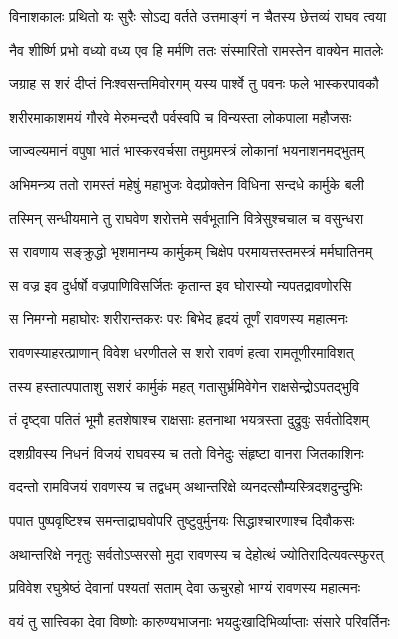 \twolineshloka
{विनाशकालः प्रथितो यः सुरैः सोऽद्य वर्तते}
{उत्तमाङ्गं न चैतस्य छेत्तव्यं राघव त्वया} %

\twolineshloka
{नैव शीर्ष्णि प्रभो वध्यो वध्य एव हि मर्मणि}
{ततः संस्मारितो रामस्तेन वाक्येन मातलेः} %

\twolineshloka
{जग्राह स शरं दीप्तं निःश्वसन्तमिवोरगम्}
{यस्य पार्श्वे तु पवनः फले भास्करपावकौ} %

\twolineshloka
{शरीरमाकाशमयं गौरवे मेरुमन्दरौ}
{पर्वस्वपि च विन्यस्ता लोकपाला महौजसः} %

\twolineshloka
{जाज्वल्यमानं वपुषा भातं भास्करवर्चसा}
{तमुग्रमस्त्रं लोकानां भयनाशनमद्भुतम्} %

\twolineshloka
{अभिमन्त्र्य ततो रामस्तं महेषुं महाभुजः}
{वेदप्रोक्तेन विधिना सन्दधे कार्मुके बली} %

\twolineshloka
{तस्मिन् सन्धीयमाने तु राघवेण शरोत्तमे}
{सर्वभूतानि वित्रेसुश्चचाल च वसुन्धरा} %

\twolineshloka
{स रावणाय सङ्क्रुद्धो भृशमानम्य कार्मुकम्}
{चिक्षेप परमायत्तस्तमस्त्रं मर्मघातिनम्} %

\twolineshloka
{स वज्र इव दुर्धर्षो वज्रपाणिविसर्जितः}
{कृतान्त इव घोरास्यो न्यपतद्रावणोरसि} %

\twolineshloka
{स निमग्नो महाघोरः शरीरान्तकरः परः}
{बिभेद हृदयं तूर्णं रावणस्य महात्मनः} %

\twolineshloka
{रावणस्याहरत्प्राणान् विवेश धरणीतले}
{स शरो रावणं हत्वा रामतूणीरमाविशत्} %

\twolineshloka
{तस्य हस्तात्पपाताशु सशरं कार्मुकं महत्}
{गतासुर्भ्रमिवेगेन राक्षसेन्द्रोऽपतद्भुवि} %

\twolineshloka
{तं दृष्ट्वा पतितं भूमौ हतशेषाश्च राक्षसाः}
{हतनाथा भयत्रस्ता दुद्रुवुः सर्वतोदिशम्} %

\twolineshloka
{दशग्रीवस्य निधनं विजयं राघवस्य च}
{ततो विनेदुः संहृष्टा वानरा जितकाशिनः} %

\twolineshloka
{वदन्तो रामविजयं रावणस्य च तद्वधम्}
{अथान्तरिक्षे व्यनदत्सौम्यस्त्रिदशदुन्दुभिः} %

\twolineshloka
{पपात पुष्पवृष्टिश्च समन्ताद्राघवोपरि}
{तुष्टुवुर्मुनयः सिद्धाश्चारणाश्च दिवौकसः} %

\twolineshloka
{अथान्तरिक्षे ननृतुः सर्वतोऽप्सरसो मुदा}
{रावणस्य च देहोत्थं ज्योतिरादित्यवत्स्फुरत्} %

\twolineshloka
{प्रविवेश रघुश्रेष्ठं देवानां पश्यतां सताम्}
{देवा ऊचुरहो भाग्यं रावणस्य महात्मनः} %

\twolineshloka
{वयं तु सात्त्विका देवा विष्णोः कारुण्यभाजनाः}
{भयदुःखादिभिर्व्याप्ताः संसारे परिवर्तिनः} %

